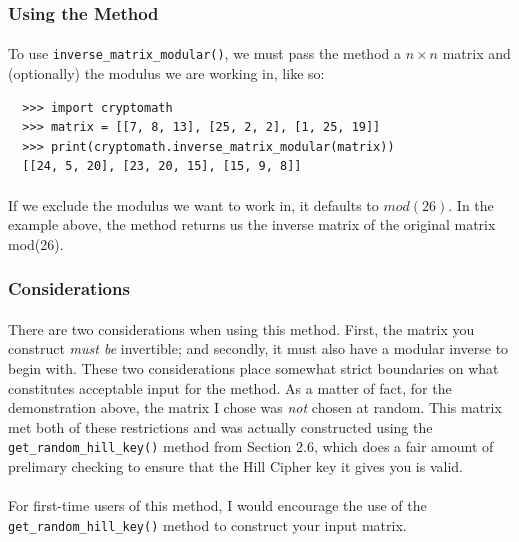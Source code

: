 \documentclass[12pt,a4paper]{article}
\begin{document}
\subsubsection{Using the Method}
\paragraph{}
To use \verb|inverse_matrix_modular()|, we must pass the method a 
$n \times n$ matrix and (optionally) the modulus we are working in, like so:

\begin{verbatim}
  >>> import cryptomath
  >>> matrix = [[7, 8, 13], [25, 2, 2], [1, 25, 19]]
  >>> print(cryptomath.inverse_matrix_modular(matrix))
  [[24, 5, 20], [23, 20, 15], [15, 9, 8]]
\end{verbatim}

\paragraph{}
If we exclude the modulus we want to work in, it defaults to $mod(26)$.
In the example above, the method returns us the inverse matrix of the original 
matrix mod(26).

\subsubsection{Considerations}
\paragraph{}
There are two considerations when using this method.  First, the 
matrix you construct \textit{must be} invertible; and secondly, it must also
have a modular inverse to begin with.  These two considerations place somewhat 
strict boundaries on what constitutes acceptable input for the method.  As a 
matter of fact, for the demonstration above, the matrix I chose was \textit{not} 
chosen at random.  This matrix met both of these restrictions and was actually 
constructed using the \verb|get_random_hill_key()| method from Section 2.6, 
which does a fair amount of prelimary checking to ensure that the Hill Cipher 
key it gives you is valid.

\paragraph{}
For first-time users of this method, I would encourage the use of the 
\verb|get_random_hill_key()| method to construct your input matrix.
\end{document}
